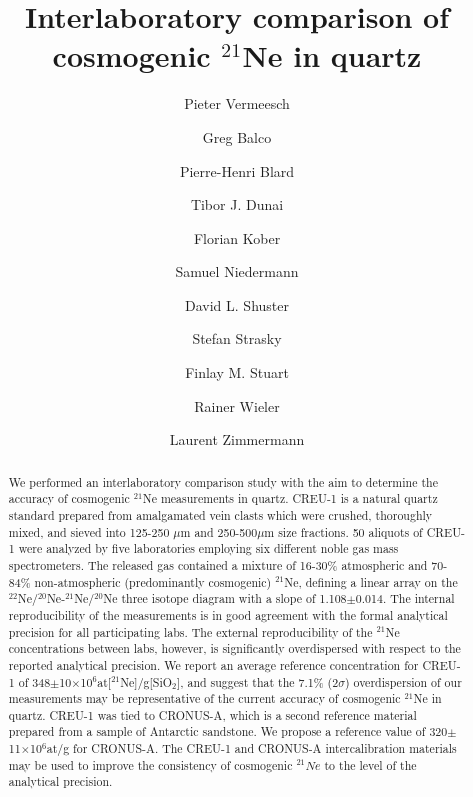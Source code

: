 \documentclass[authoryear,review,12pt]{elsarticle}
\begin{document}
\begin{frontmatter}
\title{Interlaboratory comparison of cosmogenic $^{21}$Ne in quartz}
\author[eth,ucl]{Pieter Vermeesch}
\author[bgc]{Greg Balco}
\author[crpg]{Pierre-Henri Blard}
\author[koln]{Tibor J. Dunai}
\author[eth]{Florian Kober} 
\author[gfz]{Samuel Niedermann}
\author[ucb,bgc]{David L. Shuster}
\author[eth]{Stefan Strasky}
\author[suerc]{Finlay M. Stuart}
\author[eth]{Rainer Wieler}
\author[crpg]{Laurent Zimmermann}
\address[eth]{Institute of Geochemistry and Petrology, ETH Zurich, Z\"{u}rich, Switzerland}
\address[ucl]{London Geochronology Centre, University College London, London, United Kingdom}
\address[bgc]{Berkeley Geochronology Center, Berkeley, United States}
\address[ucb]{Department of Earth and Planetary Science, University of California, Berkeley, United States}
\address[crpg]{Centre de Recherches P\'{e}trologiques et G\'{e}ochimiques, Vandoeuvre-l\`{e}s-Nancy, France}
\address[koln]{University of Cologne, K\"{o}ln, Germany}
\address[gfz]{Deutsches GeoForschungsZentrum GFZ, Potsdam, Germany}
\address[suerc]{Scottish Universities Environmental Research Centre, Glasgow, United Kingdom}

\begin{abstract}
We performed an interlaboratory comparison study with the aim to
determine the accuracy of cosmogenic $^{21}$Ne measurements in quartz.
CREU-1 is a natural quartz standard prepared from amalgamated vein
clasts which were crushed, thoroughly mixed, and sieved into 125-250
$\mu$m and 250-500$\mu$m size fractions.  50 aliquots of CREU-1 were
analyzed by five laboratories employing six different noble gas mass
spectrometers.  The released gas contained a mixture of 16-30\%
atmospheric and 70-84\% non-atmospheric (predominantly cosmogenic)
$^{21}$Ne, defining a linear array on the
$^{22}$Ne/$^{20}$Ne-$^{21}$Ne/$^{20}$Ne three isotope diagram with a
slope of 1.108$\pm$0.014.  The internal reproducibility of the
measurements is in good agreement with the formal analytical
precision for all participating labs.  The external reproducibility of
the $^{21}$Ne concentrations between labs, however, is significantly
overdispersed with respect to the reported analytical precision.  We
report an average reference concentration for CREU-1 of
348$\pm$10$\times$10$^6$at[$^{21}$Ne]/g[SiO$_2$], and suggest that the
7.1\% (2$\sigma$) overdispersion of our measurements may be
representative of the current accuracy of cosmogenic $^{21}$Ne in
quartz.  CREU-1 was tied to CRONUS-A, which is a second reference
material prepared from a sample of Antarctic sandstone.  We propose a
reference value of 320$\pm$11$\times$10$^6$at/g for CRONUS-A.  The
CREU-1 and CRONUS-A intercalibration materials may be used to improve
the consistency of cosmogenic $^{21}Ne$ to the level of the analytical
precision.
\end{abstract}
\end{frontmatter}
\end{document}
